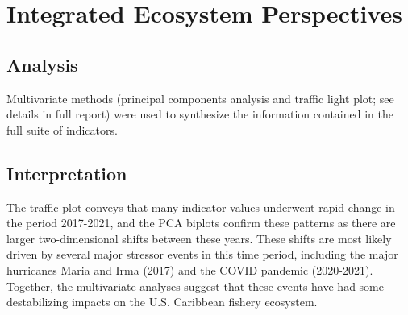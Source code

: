 \documentclass[
  10pt,
  letterpaper,
  DIV=11,
  numbers=noendperiod]{scrartcl}
\begin{document}
\vspace{0.5cm}
\section{Integrated Ecosystem Perspectives}
\vspace{0.05cm}

\subsection{Analysis}

Multivariate methods (principal components analysis and traffic light
plot; see details in full report) were used to synthesize the
information contained in the full suite of indicators.

\subsection{Interpretation}

The traffic plot conveys that many indicator values underwent rapid
change in the period 2017-2021, and the PCA biplots confirm these
patterns as there are larger two-dimensional shifts between these years.
These shifts are most likely driven by several major stressor events in
this time period, including the major hurricanes Maria and Irma (2017)
and the COVID pandemic (2020-2021). Together, the multivariate analyses
suggest that these events have had some destabilizing impacts on the
U.S. Caribbean fishery ecosystem.
\end{document}

